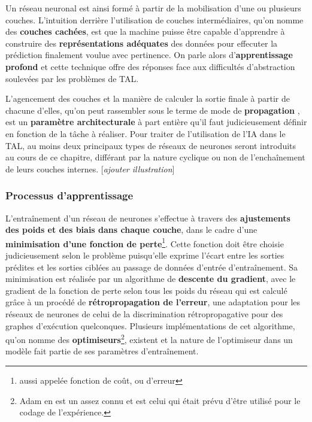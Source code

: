 \documentclass[12pt, french, twoside]{report}
\begin{document}
Un réseau neuronal est ainsi formé à partir de la mobilisation d'une ou plusieurs couches. L'intuition derrière l'utilisation de couches intermédiaires, qu'on nomme des \textbf{couches cachées}, est que la machine puisse être capable d'apprendre à construire des \textbf{représentations adéquates} des données pour effecuter la prédiction finalement voulue avec pertinence. On parle alors d'\textbf{apprentissage profond} et cette technique offre des réponses face aux difficultés d'abstraction soulevées par les problèmes de TAL.

L'agencement des couches et la manière de calculer la sortie finale à partir de chacune d'elles, qu'on peut rassembler sous le terme de \og mode de \textbf{propagation} \fg, est un \textbf{paramètre architecturale} à part entière qu'il faut judicieusement définir en fonction de la tâche à réaliser. Pour traiter de l'utilisation de l'IA dans le TAL, au moins deux principaux types de réseaux de neurones seront introduits au cours de ce chapitre, différant par la nature cyclique ou non de l'enchaînement de leurs couches internes.\citep[chap.~7, introduction + section 3]{jurafsky} [\textit{ajouter illustration}]

\subsubsection{Processus d'apprentissage}
L'entraînement d'un réseau de neurones s'effectue à travers des \textbf{ajustements des poids et des biais dans chaque couche}, dans le cadre d'une \textbf{minimisation d'une fonction de perte}\footnote{aussi appelée fonction de coût, ou d'erreur}. Cette fonction doit être choisie judicieusement selon le problème puisqu'elle exprime l'écart entre les sorties prédites et les sorties ciblées au passage de données d'entrée d'entraînement. Sa minimisation est réalisée par un algorithme de \textbf{descente du gradient}, avec le gradient de la fonction de perte selon tous les poids du réseau qui est calculé grâce à un procédé de \textbf{rétropropagation de l'erreur}, une adaptation pour les réseaux de neurones de celui de la discrimination rétropropagative pour des graphes d'exécution quelconques. Plusieurs implémentations de cet algorithme, qu'on nomme des \textbf{optimiseurs}\footnote{Adam\citep{kingma2017adam} en est un assez connu et est celui qui était prévu d'être utilisé pour le codage de l'expérience.}, existent et la nature de l'optimiseur dans un modèle fait partie de ses paramètres d'entraînement.
\end{document}
